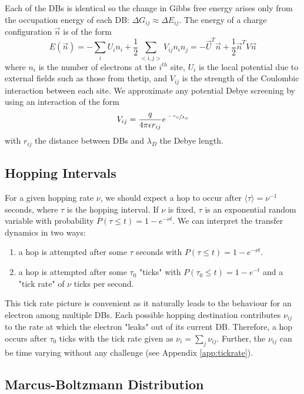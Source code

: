 \documentclass[11pt]{article}
\newcommand{\expect}[1]{\langle #1 \rangle}
\begin{document}
Each of the DBs is identical so the change in Gibbs free energy arises only from the occupation energy of each DB: $\Delta G_{ij} \approx \Delta E_{ij}$. The energy of a charge configuration $\vec{n}$ is of the form
\begin{equation}
E(\vec{n}) = -\sum_i U_i n_i + \frac{1}{2} \sum_{<i,j>} V_{ij}n_in_j = -\vec{U}^T\vec{n} + \frac{1}{2}\vec{n}^T V \vec{n}
\end{equation}
where $n_i$ is the number of electrons at the $i^{th}$ site, $U_i$ is the local potential due to external fields such as those from thetip, and $V_{ij}$ is the strength of the Coulombic interaction between each site. We approximate any potential Debye screening by using an interaction of the form
\begin{equation}
V_{ij} = \frac{q}{4\pi\epsilon r_{ij}}e^{\sfrac{-r_{ij}}{\lambda_D}}
\end{equation}
with $r_{ij}$ the distance between DBs and $\lambda_D$ the Debye length.

\subsection{Hopping Intervals}

For a given hopping rate $\nu$, we should expect a hop to occur after $\expect{\tau} = \nu^{-1}$ seconds, where $\tau$ is the hopping interval. If $\nu$ is fixed, $\tau$ is an exponential random variable with probability $P(\tau \leq t) = 1-e^{-\nu t}$. We can interpret the transfer dynamics in two ways:
\begin{enumerate}
 \item a hop is attempted after some $\tau$ seconds with $P(\tau \leq t) = 1-e^{-\nu t}$.
 \item a hop is attempted after some $\tau_0$ "ticks" with $P(\tau_0 \leq t) = 1-e^{-t}$ and a "tick rate" of $\nu$ ticks per second.
\end{enumerate}
This tick rate picture is convenient as it naturally leads to the behaviour for an electron among multiple DBs. Each possible hopping destination contributes $\nu_{ij}$ to the rate at which the electron "leaks" out of its current DB. Therefore, a hop occurs after $\tau_0$ ticks with the tick rate given as $\nu_i = \sum_j \nu_{ij}$. Further, the $\nu_{ij}$ can be time varying without any challenge (see Appendix \ref{app:tickrate}).

\subsection{Marcus-Boltzmann Distribution}
\end{document}
